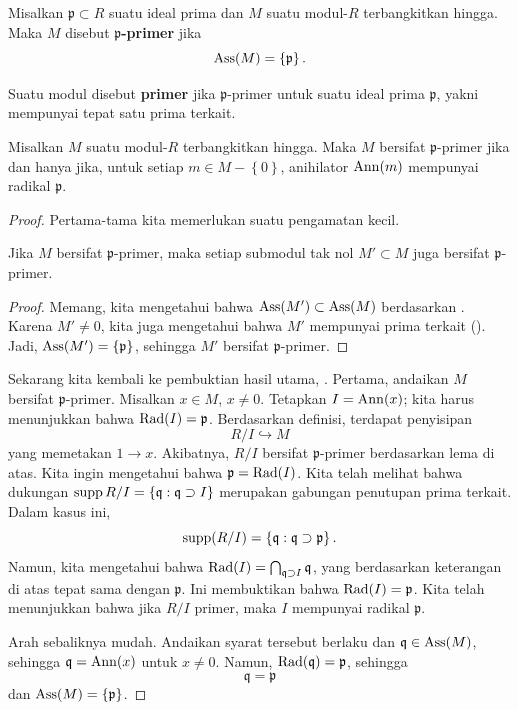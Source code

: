 \begin{definition} 
Misalkan $\mathfrak{p} \subset R$ suatu ideal prima dan $M$ suatu modul-$R$ terbangkitkan hingga. Maka $M$ disebut
\textbf{$\mathfrak{p}$-primer} jika 
\[ \operatorname{Ass}(M) = \left\{\mathfrak{p}\right\}.  \]

Suatu modul disebut \textbf{primer} jika $\mathfrak{p}$-primer untuk suatu
ideal prima $\mathfrak{p}$, yakni mempunyai tepat satu prima terkait. 
\end{definition} 

\begin{proposition} \label{whenisprimary}
Misalkan $M$ suatu modul-$R$ terbangkitkan hingga. Maka $M$ bersifat \textbf{$\mathfrak{p}$}-primer jika
dan hanya jika, untuk setiap $m \in M - \left\{0\right\}$, 
anihilator $\operatorname{Ann}(m)$ mempunyai radikal $\mathfrak{p}$.
\end{proposition} 
\begin{proof} 
Pertama-tama kita memerlukan suatu pengamatan kecil.

\begin{lemma} 
Jika $M$ bersifat $\mathfrak{p}$-primer, maka setiap submodul tak nol $M' \subset M$ juga
bersifat $\mathfrak{p}$-primer.
\end{lemma} 
\begin{proof} 
Memang, kita mengetahui bahwa $\operatorname{Ass}(M') \subset \operatorname{Ass}(M)$ berdasarkan .
Karena $M' \neq 0$, kita juga mengetahui bahwa $M'$ mempunyai prima terkait
(). Jadi, $ \operatorname{Ass}(M') = \{\mathfrak{p}\}$, sehingga
$M'$ bersifat $\mathfrak{p}$-primer.
\end{proof} 

Sekarang kita kembali ke pembuktian hasil utama,
.
Pertama, andaikan $M$ bersifat $\mathfrak{p}$-primer. Misalkan $x \in M$, $x \neq 0$. Tetapkan
$I = \operatorname{Ann}(x)$; kita harus menunjukkan bahwa $\operatorname{Rad}(I)  =\mathfrak{p}$. Berdasarkan definisi, terdapat penyisipan
\[ R/I \hookrightarrow M  \]
yang memetakan $1 \to x$. Akibatnya, $R/I$ bersifat $\mathfrak{p}$-primer berdasarkan lema di atas.
Kita ingin mengetahui bahwa $\mathfrak{p}  = \operatorname{Rad}(I)$. 
Kita telah melihat bahwa dukungan $\operatorname{supp} R/I = \left\{\mathfrak{q}: \mathfrak{q}
\supset I\right\}$ merupakan gabungan penutupan prima terkait. Dalam
kasus ini, 
\[ \operatorname{supp}(R/I) = \left\{\mathfrak{q}: \mathfrak{q} \supset \mathfrak{p}\right\}
.\]
Namun, kita mengetahui bahwa $\operatorname{Rad}(I) = \bigcap_{\mathfrak{q} \supset I} \mathfrak{q}$,
yang berdasarkan keterangan di atas tepat sama dengan $\mathfrak{p}$. Ini membuktikan bahwa $\operatorname{Rad}(I) =
\mathfrak{p}$.
Kita telah menunjukkan bahwa jika $R/I$ primer, maka $I$ mempunyai radikal $\mathfrak{p}$.

Arah sebaliknya mudah. 
Andaikan syarat tersebut berlaku dan $\mathfrak{q} \in \operatorname{Ass}(M)$, sehingga $\mathfrak{q} =
\operatorname{Ann}(x)$ untuk $x \neq 0$. Namun, $\operatorname{Rad}(\mathfrak{q}) = \mathfrak{p}$, sehingga 
\[ \mathfrak{q} = \mathfrak{p}  \] dan $\operatorname{Ass}(M) = \left\{\mathfrak{p}\right\}$.
\end{proof} 

